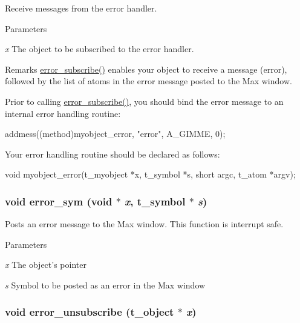 Receive messages from the error handler. 
\begin{DoxyParams}{Parameters}
\item[{\em x}]The object to be subscribed to the error handler.\end{DoxyParams}
\begin{DoxyRemark}{Remarks}
\hyperlink{group__misc_gaffc50c996275103b9d94ec309c6d8be1}{error\_\-subscribe()} enables your object to receive a message (error), followed by the list of atoms in the error message posted to the Max window.
\end{DoxyRemark}
Prior to calling \hyperlink{group__misc_gaffc50c996275103b9d94ec309c6d8be1}{error\_\-subscribe()}, you should bind the error message to an internal error handling routine: 
\begin{DoxyCode}
    addmess((method)myobject_error, "error", A_GIMME, 0);
\end{DoxyCode}
 Your error handling routine should be declared as follows: 
\begin{DoxyCode}
    void myobject_error(t_myobject *x, t_symbol *s, short argc, t_atom *argv);
\end{DoxyCode}
 \hypertarget{group__misc_ga0a094decd1408632226438943e55de81}{
\subsubsection[{error\_\-sym}]{\setlength{\rightskip}{0pt plus 5cm}void error\_\-sym (void $\ast$ {\em x}, \/  {\bf t\_\-symbol} $\ast$ {\em s})}}
\label{group__misc_ga0a094decd1408632226438943e55de81}


Posts an error message to the Max window. This function is interrupt safe.


\begin{DoxyParams}{Parameters}
\item[{\em x}]The object's pointer \item[{\em s}]Symbol to be posted as an error in the Max window \end{DoxyParams}
\hypertarget{group__misc_ga155f65793ec4c34abc6746015a2beca6}{
\subsubsection[{error\_\-unsubscribe}]{\setlength{\rightskip}{0pt plus 5cm}void error\_\-unsubscribe ({\bf t\_\-object} $\ast$ {\em x})}}
\label{group__misc_ga155f65793ec4c34abc6746015a2beca6}


